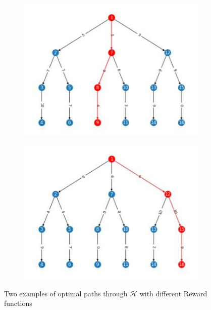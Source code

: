 \documentclass{article}
\begin{document}
\begin{figure}[h!]
    \centering
    \begin{subfigure}[b]{0.45\textwidth}
        \centering
        \includegraphics[width=\textwidth]{figs/Result1.jpg}
    \end{subfigure}
    \hfill
    \begin{subfigure}[b]{0.45\textwidth}
        \centering
        \includegraphics[width=\textwidth]{figs/Result2.jpg}
    \end{subfigure}
    \caption{Two examples of optimal paths through $\mathcal{H}$ with different Reward functions}
    \label{fig:opt_path}
\end{figure}
\end{document}
